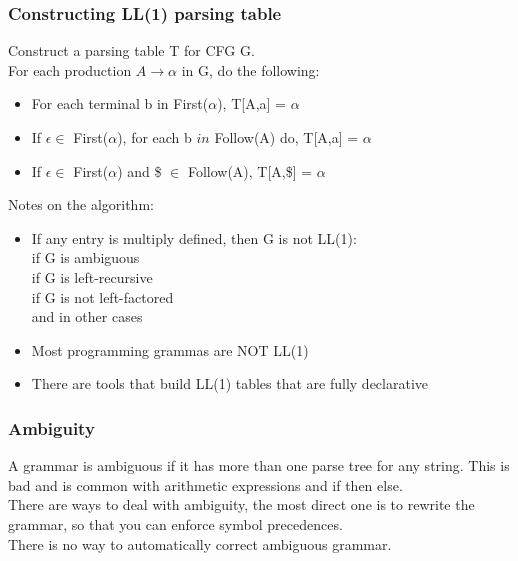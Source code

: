\documentclass[12pt]{article}
\begin{document}
\subsubsection{Constructing LL(1) parsing table}
Construct a parsing table T for CFG G. 
\\ For each production $A \rightarrow \alpha$ in G, do the following:
\begin{itemize}
    \item For each terminal b in First($\alpha$), T[A,a] = $\alpha$
    \item If $\epsilon \in$ First($\alpha$), for each b $in$ Follow(A) do, T[A,a] = $\alpha$
    \item If $\epsilon \in$ First($\alpha$) and \$ $\in$ Follow(A), T[A,\$] = $\alpha$
\end{itemize}
Notes on the algorithm:
\begin{itemize}
    \item If any entry is multiply defined, then G is not LL(1): 
        \\ if G is ambiguous
        \\ if G is left-recursive 
        \\ if G is not left-factored
        \\ and in other cases 
    \item Most programming grammas are NOT LL(1) 
    \item There are tools that build LL(1) tables that are fully declarative
\end{itemize}

\subsubsection{Ambiguity} 
A grammar is ambiguous if it has more than one parse tree for any string. This is bad and is common with arithmetic expressions and if then else.
\\ There are ways to deal with ambiguity, the most direct one is to rewrite the grammar, so that you can enforce symbol precedences.
\\ There is no way to automatically correct ambiguous grammar.
\end{document}
